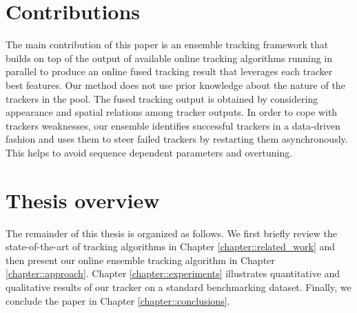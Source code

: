 \section{Contributions}

The main contribution of this paper is an ensemble tracking
framework that builds on top of the output of available online tracking
algorithms running in parallel to produce an online fused tracking result that
leverages each tracker best features. Our method does not use prior knowledge
about the nature of the trackers in the pool.
The fused tracking output is obtained by considering appearance and spatial
relations among tracker outputs.
In order to cope with trackers weaknesses,
our ensemble identifies successful trackers in a data-driven fashion
and uses them to steer failed trackers by restarting them asynchronously.
This helps to avoid sequence dependent parameters and overtuning.

\section{Thesis overview}

The remainder of this thesis is organized as follows.
We first briefly review the state-of-the-art of tracking algorithms
in Chapter \ref{chapter::related_work} and
then present our online ensemble tracking algorithm
in Chapter \ref{chapter::approach}.
Chapter \ref{chapter::experiments} illustrates quantitative and qualitative results of our
tracker on a standard benchmarking dataset.
Finally, we conclude the paper in Chapter \ref{chapter::conclusions}.
